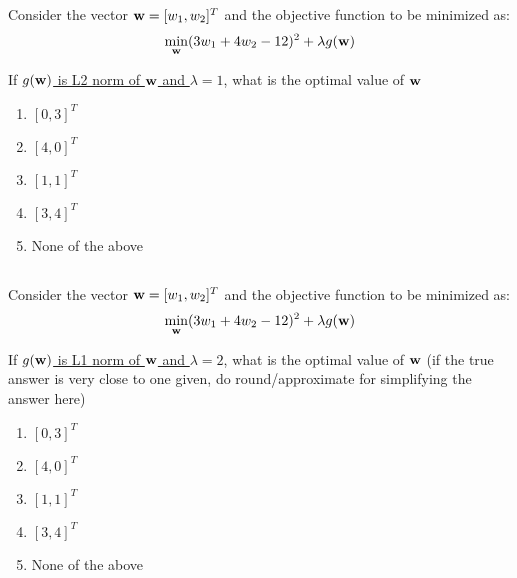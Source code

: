 \begin{frame}
\section{}
  Consider the vector ${\bf w} = [w_1, w_2]^T$ and the objective function to be minimized as:
  \[ \min_{\bf w} (3w_1 + 4 w_2 - 12)^2 + \lambda g({\bf w})\]

  If \underline{ $g({\bf w})$ is L2 norm of ${\bf w}$ and $\lambda=1$}, what is the optimal value of ${\bf w}$
    \begin{enumerate}[label=(\Alph*)]
     \item $[0,3]^T$
     \item $[4,0]^T$
     \item $[1,1]^T$
     \item $[3,4]^T$
     \item None of the above    %
    \end{enumerate}
\end{frame}

\begin{frame}
\section{}
  Consider the vector ${\bf w} = [w_1, w_2]^T$ and the objective function to be minimized as:
  \[ \min_{\bf w} (3w_1 + 4 w_2 - 12)^2 + \lambda g({\bf w})\]

  If \underline{$g({\bf w})$ is L1 norm of ${\bf w}$ and $\lambda =2$}, what is the optimal value of ${\bf w}$
  (if the true answer is very close to one given, do round/approximate for simplifying the answer here)
     \begin{enumerate}[label=(\Alph*)]
      \item $[0,3]^T$   %
      \item $[4,0]^T$
      \item $[1,1]^T$
      \item $[3,4]^T$
      \item None of the above   %
     \end{enumerate}
\end{frame}
